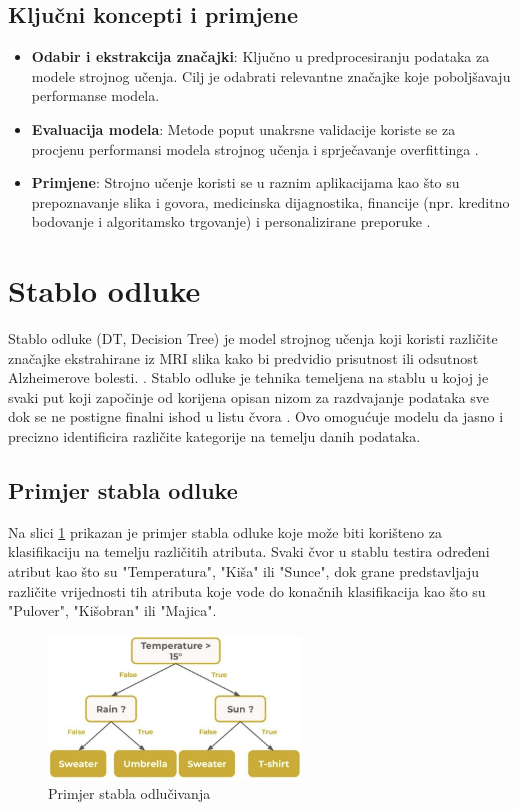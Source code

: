 \documentclass[zavrsnirad,upload]{fer}
\begin{document}
\subsection{Ključni koncepti i primjene}

\begin{itemize}
	\item \textbf{Odabir i ekstrakcija značajki}: Ključno u predprocesiranju podataka za modele strojnog učenja. Cilj je odabrati relevantne značajke koje poboljšavaju performanse modela.
	\item \textbf{Evaluacija modela}: Metode poput unakrsne validacije koriste se za procjenu performansi modela strojnog učenja i sprječavanje overfittinga \cite{ibm_machine_learning}.
	\item \textbf{Primjene}: Strojno učenje koristi se u raznim aplikacijama kao što su prepoznavanje slika i govora, medicinska dijagnostika, financije (npr. kreditno bodovanje i algoritamsko trgovanje) i personalizirane preporuke \cite{ibm_machine_learning}.
\end{itemize}


\section{Stablo odluke}
Stablo odluke (DT, Decision Tree) je model strojnog učenja koji koristi različite značajke ekstrahirane iz MRI slika kako bi predvidio prisutnost ili odsutnost Alzheimerove bolesti. \cite{somvanshi2016}. Stablo odluke je tehnika temeljena na stablu u kojoj je svaki put koji započinje od korijena opisan nizom za razdvajanje podataka sve dok se ne postigne finalni ishod u listu čvora \cite{Charbuty_Abdulazeez_2021}. Ovo omogućuje modelu da jasno i precizno identificira različite kategorije na temelju danih podataka.

\subsection{Primjer stabla odluke}
Na slici \ref{fig:decision_tree} prikazan je primjer stabla odluke koje može biti korišteno za klasifikaciju na temelju različitih atributa. Svaki čvor u stablu testira određeni atribut kao što su "Temperatura", "Kiša" ili "Sunce", dok grane predstavljaju različite vrijednosti tih atributa koje vode do konačnih klasifikacija kao što su "Pulover", "Kišobran" ili "Majica".

\begin{figure}[h]
	\centering
	\includegraphics[width=0.6\textwidth]{Figures/DecisionTree.jpg}
	\caption{Primjer stabla odlučivanja \cite{Keldenich2022}}
	\label{fig:decision_tree}
\end{figure}
\end{document}
